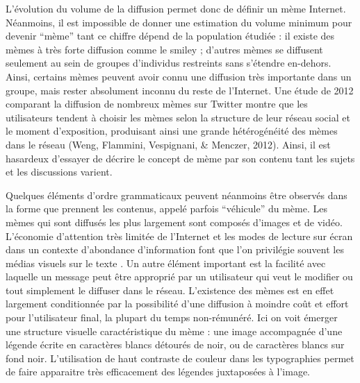 L{\textquoteright}\'evolution du volume de la diffusion permet donc de d\'efinir un m\`eme Internet. N\'eanmoins, il est impossible de donner une estimation du volume minimum pour devenir {\textquotedblleft}m\`eme{\textquotedblright} tant ce chiffre d\'epend de la population \'etudi\'ee : il existe des m\`emes \`a tr\`es forte diffusion comme le smiley ; d{\textquoteright}autres m\`emes se diffusent seulement au sein de groupes d{\textquoteright}individus restreints sans s{\textquoteright}\'etendre en-dehors. Ainsi, certains m\`emes peuvent avoir connu une diffusion tr\`es importante dans un groupe, mais rester absolument inconnu du reste de l{\textquoteright}Internet. Une \'etude de 2012 comparant la diffusion de nombreux m\`emes sur Twitter montre que les utilisateurs tendent \`a choisir les m\`emes selon la structure de leur r\'eseau social et le moment d{\textquoteright}exposition, produisant ainsi une grande h\'et\'erog\'en\'eit\'e des m\`emes dans le r\'eseau (Weng, Flammini, Vespignani, \& Menczer, 2012). Ainsi, il est hasardeux d{\textquoteright}essayer de d\'ecrire le concept de m\`eme par son contenu tant les sujets et les discussions varient. 

Quelques \'el\'ements d{\textquoteright}ordre grammaticaux peuvent n\'eanmoins \^etre observ\'es dans la forme que prennent les contenus, appel\'e parfois {\textquotedblleft}v\'ehicule{\textquotedblright} du m\`eme. Les m\`emes qui sont diffus\'es les plus largement sont compos\'es d{\textquoteright}images et de vid\'eo. L{\textquoteright}\'economie d{\textquoteright}attention tr\`es limit\'ee de l{\textquoteright}Internet et les modes de lecture sur \'ecran dans un contexte d{\textquoteright}abondance d{\textquoteright}information font que l{\textquoteright}on privil\'egie souvent les m\'edias visuels sur le texte \cite{Goldhaber2006}. Un autre \'el\'ement important est la facilit\'e avec laquelle un message peut \^etre appropri\'e par un utilisateur qui veut le modifier ou tout simplement le diffuser dans le r\'eseau. L{\textquoteright}existence des m\`emes est en effet largement conditionn\'ee par la possibilit\'e d{\textquoteright}une diffusion \`a moindre co\^ut et effort pour l{\textquoteright}utilisateur final, la plupart du temps non-r\'emun\'er\'e. Ici on voit \'emerger une structure visuelle caract\'eristique du m\`eme : une image accompagn\'ee d{\textquoteright}une l\'egende \'ecrite en caract\`eres blancs d\'etour\'es de noir, ou de caract\`eres blancs sur fond noir. L{\textquoteright}utilisation de haut contraste de couleur dans les typographies permet de faire apparaitre tr\`es efficacement des l\'egendes juxtapos\'ees \`a l{\textquoteright}image.


